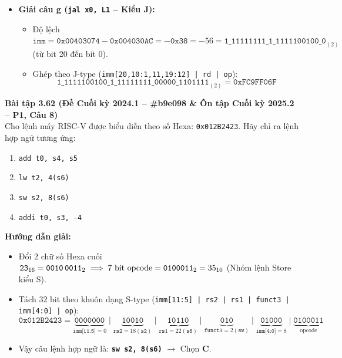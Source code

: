 \begin{itemize}
\begin{itemize}
    \end{itemize}
    \item \textbf{Giải câu g (\texttt{jal x0, L1} -- Kiểu J):}
    \begin{itemize}
        \item Độ lệch $\texttt{imm} = \texttt{0x00403074} - \texttt{0x004030AC} = -\texttt{0x38} = -56 = \texttt{1\_11111111\_1\_1111100100\_0}_{(2)}$ (từ bit 20 đến bit 0).
        \item Ghép theo J-type (\texttt{imm[20,10:1,11,19:12] | rd | op}):
        $$\texttt{1\_1111100100\_1\_11111111\_00000\_1101111}_{(2)} = \mathbf{\texttt{0xFC9FF06F}}$$
    \end{itemize}
\end{itemize}

\textbf{Bài tập 3.62 (Đề Cuối kỳ 2024.1 -- \#b9e098 \& Ôn tập Cuối kỳ 2025.2 -- P1, Câu 8)}\\
Cho lệnh máy RISC-V được biểu diễn theo số Hexa: \texttt{0x012B2423}. Hãy chỉ ra lệnh hợp ngữ tương ứng:
\begin{enumerate}[label=\Alph*.]
    \item \texttt{add t0, s4, s5}
    \item \texttt{lw t2, 4(s6)}
    \item \texttt{sw s2, 8(s6)}
    \item \texttt{addi t0, s3, -4}
\end{enumerate}
\textbf{Hướng dẫn giải:}
\begin{itemize}
    \item Đổi 2 chữ số Hexa cuối $\texttt{23}_{16} = \texttt{0010\,0011}_2 \implies 7\text{ bit opcode} = \texttt{0100011}_2 = 35_{10}$ (Nhóm lệnh Store kiểu S).
    \item Tách 32 bit theo khuôn dạng S-type (\texttt{imm[11:5] | rs2 | rs1 | funct3 | imm[4:0] | op}):
    $$\texttt{0x012B2423} = \underbrace{\texttt{0000000}}_{\texttt{imm[11:5]}=0} \mid \underbrace{\texttt{10010}}_{\texttt{rs2}=18 (\texttt{s2})} \mid \underbrace{\texttt{10110}}_{\texttt{rs1}=22 (\texttt{s6})} \mid \underbrace{\texttt{010}}_{\texttt{funct3}=2 (\texttt{sw})} \mid \underbrace{\texttt{01000}}_{\texttt{imm[4:0]}=8} \mid \underbrace{\texttt{0100011}}_{\text{opcode}}$$
    \item Vậy câu lệnh hợp ngữ là: \textbf{\texttt{sw s2, 8(s6)}} $\rightarrow$ Chọn \textbf{C}.
\end{itemize}

